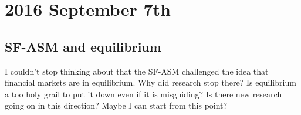 \section*{2016 September 7th}

\subsection*{SF-ASM and equilibrium}
I couldn't stop thinking about that the SF-ASM challenged the idea that financial markets are in equilibrium. Why did research stop there? Is equilibrium a too holy grail to put it down even if it is misguiding? Is there new research going on in this direction? Maybe I can start from this point?